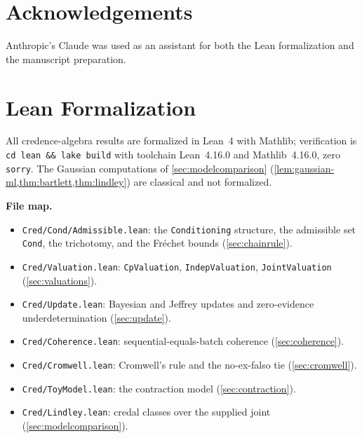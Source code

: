 \documentclass[11pt,a4paper]{article}
\begin{document}
\section*{Acknowledgements}

Anthropic's Claude was used as an assistant for both the Lean
formalization and the manuscript preparation.





\appendix

\section{Lean Formalization}
\label{app:lean}

All credence-algebra results are formalized in Lean~4 with Mathlib;
verification is \texttt{cd lean \&\& lake build} with toolchain
Lean~4.16.0 and Mathlib~4.16.0, zero \texttt{sorry}.
The Gaussian computations of \cref{sec:modelcomparison}
(\cref{lem:gaussian-ml,thm:bartlett,thm:lindley}) are classical and not
formalized.

\textbf{File map.}
\begin{itemize}[nosep]
\item \texttt{Cred/Cond/Admissible.lean}: the \texttt{Conditioning}
  structure, the admissible set \texttt{Cond}, the trichotomy, and the
  Fr\'echet bounds (\cref{sec:chainrule}).
\item \texttt{Cred/Valuation.lean}: \texttt{CpValuation},
  \texttt{IndepValuation}, \texttt{JointValuation}
  (\cref{sec:valuations}).
\item \texttt{Cred/Update.lean}: Bayesian and Jeffrey updates and
  zero-evidence underdetermination (\cref{sec:update}).
\item \texttt{Cred/Coherence.lean}: sequential-equals-batch coherence
  (\cref{sec:coherence}).
\item \texttt{Cred/Cromwell.lean}: Cromwell's rule and the
  no-ex-falso tie (\cref{sec:cromwell}).
\item \texttt{Cred/ToyModel.lean}: the contraction model
  (\cref{sec:contraction}).
\item \texttt{Cred/Lindley.lean}: credal classes over the supplied
  joint (\cref{sec:modelcomparison}).
\end{itemize}
\end{document}
